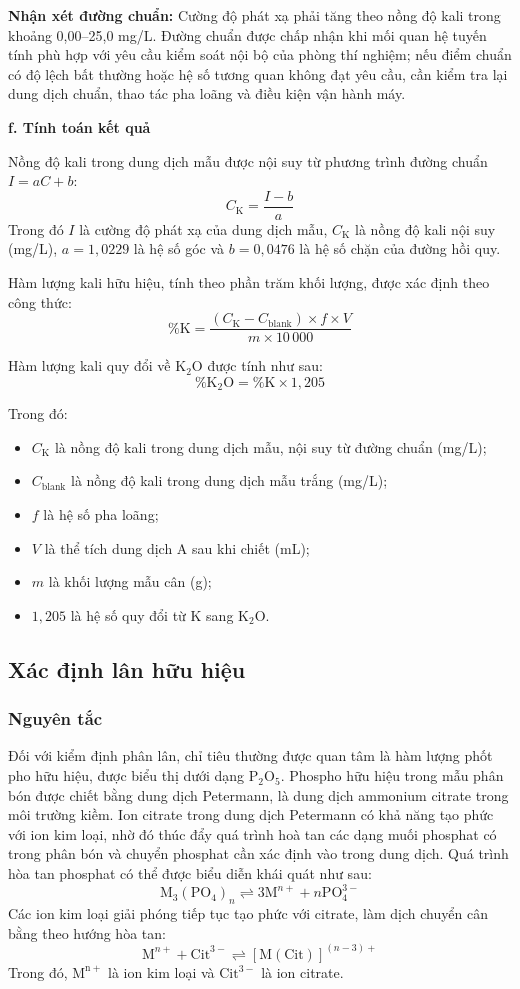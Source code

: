 \noindent\textbf{Nhận xét đường chuẩn:} Cường độ phát xạ phải tăng theo nồng độ kali trong khoảng 0,00--25,0 mg/L. Đường chuẩn được chấp nhận khi mối quan hệ tuyến tính phù hợp với yêu cầu kiểm soát nội bộ của phòng thí nghiệm; nếu điểm chuẩn có độ lệch bất thường hoặc hệ số tương quan không đạt yêu cầu, cần kiểm tra lại dung dịch chuẩn, thao tác pha loãng và điều kiện vận hành máy.

\noindent\textbf{f. Tính toán kết quả}\par
Nồng độ kali trong dung dịch mẫu được nội suy từ phương trình đường chuẩn $I=aC+b$:
\[
  C_{\mathrm{K}} = \frac{I-b}{a}
\]
Trong đó $I$ là cường độ phát xạ của dung dịch mẫu, $C_{\mathrm{K}}$ là nồng độ kali nội suy (mg/L), $a=1{,}0229$ là hệ số góc và $b=0{,}0476$ là hệ số chặn của đường hồi quy.

Hàm lượng kali hữu hiệu, tính theo phần trăm khối lượng, được xác định theo công thức:
\[
  \%\mathrm{K} = \frac{\left(C_{\mathrm{K}}-C_{\mathrm{blank}}\right) \times f \times V}{m \times 10\,000}
\]

Hàm lượng kali quy đổi về \(\mathrm{K_2O}\) được tính như sau:
\[
  \%\mathrm{K_2O} = \%\mathrm{K} \times 1{,}205
\]

Trong đó:
\begin{itemize}
  \item $C_{\mathrm{K}}$ là nồng độ kali trong dung dịch mẫu, nội suy từ đường chuẩn (mg/L);
  \item $C_{\mathrm{blank}}$ là nồng độ kali trong dung dịch mẫu trắng (mg/L);
  \item $f$ là hệ số pha loãng;
  \item $V$ là thể tích dung dịch A sau khi chiết (mL);
  \item $m$ là khối lượng mẫu cân (g);
  \item $1{,}205$ là hệ số quy đổi từ K sang \(\mathrm{K_2O}\).
\end{itemize}

\subsection{Xác định lân hữu hiệu}
\subsubsection{Nguyên tắc}
Đối với kiểm định phân lân, chỉ tiêu thường được quan tâm là hàm lượng phốt pho hữu hiệu, được biểu thị dưới dạng \(\mathrm{P_2O_5}\).
Phospho hữu hiệu trong mẫu phân bón được chiết bằng dung dịch Petermann, là dung dịch ammonium citrate trong môi trường kiềm.
Ion citrate trong dung dịch Petermann có khả năng tạo phức với ion kim loại, nhờ đó thúc đẩy quá trình hoà tan các dạng muối phosphat có trong phân bón và chuyển phosphat cần xác định vào trong dung dịch.
Quá trình hòa tan phosphat có thể được biểu diễn khái quát như sau:
\[
  \mathrm{M_3(PO_4)}_n \rightleftharpoons 3\mathrm{M}^{n+} + n\mathrm{PO_4^{3-}}
\]
Các ion kim loại giải phóng tiếp tục tạo phức với citrate, làm dịch chuyển cân bằng theo hướng hòa tan:
\[
  \mathrm{M}^{n+} + \mathrm{Cit}^{3-} \rightleftharpoons [\mathrm{M(Cit)}]^{(n-3)+}
\]
Trong đó, $\mathrm{M^{n+}}$ là ion kim loại và $\mathrm{Cit^{3-}}$ là ion citrate.


